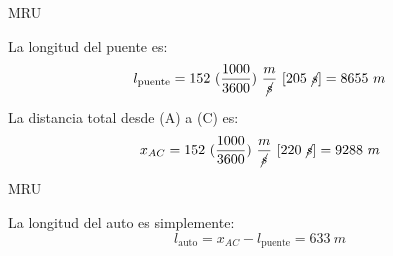 \documentclass[%
final,
total,
slideBW,
colorBG,
pdf,
accumulate,
]{prosper}
\begin{document}
\begin{slide}{MRU}
% 

La longitud del puente es:
{\large
\begin{equation} 
l_{\text{puente}}=
152~(\frac{1000}{3600})~
\frac{m}{\cancel{s}}~[205~\cancel{s}]=
8655~m
\end{equation}
}

                               

La distancia total desde (A) a (C) es: 
{\large
\begin{equation} 
x_{AC}=
152~(\frac{1000}{3600})~
\frac{m}{\cancel{s}}~[220~\cancel{s}]=
9288~m
\end{equation}
}

\end{slide}

\begin{slide}{MRU}
% 

La longitud del auto es simplemente:
{\large
\begin{equation} 
l_{\text{auto}}=
x_{AC}-l_{\text{puente}}
=
633~m
\end{equation}
}

                               




\end{slide}


\end{document}
